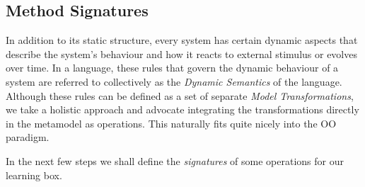 \newpage
\subsection{Method Signatures}
\visHeader
\hypertarget{static:methods vis}{}

In addition to its static structure, every system has certain dynamic aspects that describe the system's behaviour and how it reacts to external stimulus or
evolves over time.  In a language, these rules that govern the dynamic behaviour of a system are referred to collectively as
the \emph{Dynamic Semantics} of the language.
Although these rules can be defined as a set of separate \emph{Model Transformations}, we take a holistic approach and advocate integrating the transformations
directly in the metamodel as operations. This naturally fits quite nicely into the OO paradigm.

In the next few steps we shall define the \emph{signatures} of some operations for our learning box.

